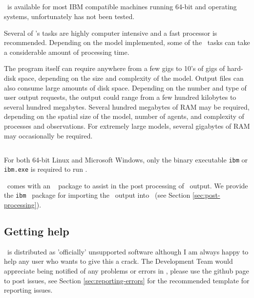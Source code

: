 \subsection{}
\IBM\ is available for most IBM compatible machines running 64-bit  and  operating systems, unfortunately  has not been tested.

Several of \IBM 's tasks are highly computer intensive and a fast processor is recommended. Depending on the model implemented, some of the \IBM\ tasks can take a considerable amount of processing time.

The program itself can require anywhere from a few gigs to 10's of gigs of hard-disk space, depending on the size and complexity of the model. Output files can also consume large amounts of disk space. Depending on the number and type of user output requests, the output could range from a few hundred kilobytes to several hundred megabytes. Several hundred megabytes of RAM may be required, depending on the spatial size of the model, number of agents, and complexity of processes and observations. For extremely large models, several gigabytes of RAM may occasionally be required. 

\subsection{}

For both 64-bit Linux and Microsoft Windows, only the binary executable \texttt{ibm} or \texttt{ibm.exe} is required to run \IBM .


\IBM\ comes with an \href{http://www.r-project.org}{\R}\ \citep{R} package to assist in the post processing of \IBM\ output. We provide the \texttt{ibm} \R\ package for importing the \IBM\ output into \R\ (see Section \ref{sec:post-processing}).

\subsection{Getting help}

\IBM\ is distributed as 'officially' unsupported software although I am always happy to help any user who wants to give this a crack. The Development Team would appreciate being notified of any problems or errors in \IBM , please use the github page to post issues, see Section \ref{sec:reporting-errors} for the recommended template for reporting issues.

